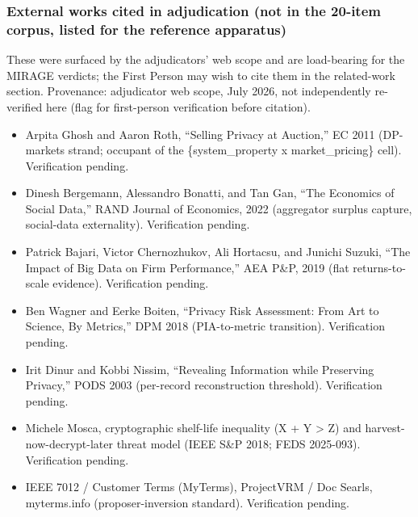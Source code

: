 \documentclass[
  11pt,
]{article}
\providecommand{\tightlist}{%
  \setlength{\itemsep}{0pt}\setlength{\parskip}{0pt}}
\begin{document}
\subsubsection{External works cited in adjudication (not in the 20-item
corpus, listed for the reference
apparatus)}\label{external-works-cited-in-adjudication-not-in-the-20-item-corpus-listed-for-the-reference-apparatus}

These were surfaced by the adjudicators' web scope and are load-bearing
for the MIRAGE verdicts; the First Person may wish to cite them in the
related-work section. Provenance: adjudicator web scope, July 2026, not
independently re-verified here (flag for first-person verification
before citation).

\begin{itemize}
\tightlist
\item
  Arpita Ghosh and Aaron Roth, ``Selling Privacy at Auction,'' EC 2011
  (DP-markets strand; occupant of the \{system\_property x
  market\_pricing\} cell). Verification pending.
\item
  Dinesh Bergemann, Alessandro Bonatti, and Tan Gan, ``The Economics of
  Social Data,'' RAND Journal of Economics, 2022 (aggregator surplus
  capture, social-data externality). Verification pending.
\item
  Patrick Bajari, Victor Chernozhukov, Ali Hortacsu, and Junichi Suzuki,
  ``The Impact of Big Data on Firm Performance,'' AEA P\&P, 2019 (flat
  returns-to-scale evidence). Verification pending.
\item
  Ben Wagner and Eerke Boiten, ``Privacy Risk Assessment: From Art to
  Science, By Metrics,'' DPM 2018 (PIA-to-metric transition).
  Verification pending.
\item
  Irit Dinur and Kobbi Nissim, ``Revealing Information while Preserving
  Privacy,'' PODS 2003 (per-record reconstruction threshold).
  Verification pending.
\item
  Michele Mosca, cryptographic shelf-life inequality (X + Y
  \textgreater{} Z) and harvest-now-decrypt-later threat model (IEEE
  S\&P 2018; FEDS 2025-093). Verification pending.
\item
  IEEE 7012 / Customer Terms (MyTerms), ProjectVRM / Doc Searls,
  myterms.info (proposer-inversion standard). Verification pending.
\end{itemize}
\end{document}
